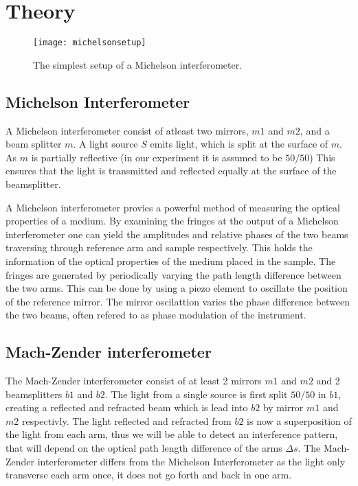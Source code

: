 \section{Theory}
\begin{figure*}
    \centering
    \texttt{[image: michelsonsetup]}
    \caption{The simplest setup of a Michelson interferometer.}
    \label{fig:configuration}
\end{figure*}
\subsection{Michelson Interferometer}
A Michelson interferometer consist of atleast two mirrors, $m1$ and $m2$, and a beam splitter $m$. A light source $S$ emits light, which is split at the surface of $m$. As $m$ is partially reflective (in our experiment it is assumed to be $50/50$) This ensures that the light is transmitted and reflected equally at the surface of the beamsplitter.

A Michelson interferometer provies a powerful method of measuring the optical properties of a medium. By examining the fringes at the output of a Michelson interferometer one can yield the amplitudes and relative phases of the two beams traversing through reference arm and sample respectively. This holds the information of the optical properties of the medium placed in the sample. The fringes are generated by periodically varying the path length difference between the two arms. This can be done by using a piezo element to oscillate the position of the reference mirror. The mirror oscilattion varies the phase difference between the two beams, often refered to as phase modulation of the instrument.


\subsection{Mach-Zender interferometer}

The Mach-Zender interferometer consist of at least 2 mirrors $m1$ and $m2$ and 2 beamsplitters $b1$ and $b2$. The light from a single source is first split $50/50$ in $b1$, creating a reflected and refracted beam which is lead into $b2$ by mirror $m1$ and $m2$ respectivly. The light reflected and refracted from $b2$ is now a superposition of the light from each arm, thus we will be able to detect an interference pattern, that will depend on the optical path length difference of the arms $\Delta s$. The Mach-Zender interferometer differs from the Michelson Interferometer as the light only transverse each arm once, it does not go forth and back in one arm. 

